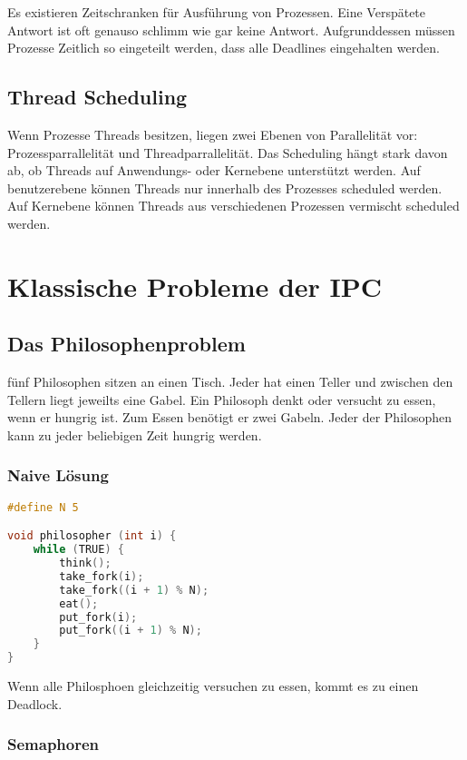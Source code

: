 Es existieren Zeitschranken für Ausführung von Prozessen. Eine Verspätete Antwort ist oft genauso schlimm wie gar keine Antwort. Aufgrunddessen müssen Prozesse Zeitlich so eingeteilt werden, dass alle Deadlines eingehalten werden.

\subsection{Thread Scheduling}

Wenn Prozesse Threads besitzen, liegen zwei Ebenen von Parallelität vor: Prozessparrallelität und Threadparrallelität. Das Scheduling hängt stark davon ab, ob Threads auf Anwendungs- oder Kernebene unterstützt werden. Auf benutzerebene können Threads nur innerhalb des Prozesses scheduled werden. Auf Kernebene können Threads aus verschiedenen Prozessen vermischt scheduled werden.

\section{Klassische Probleme der IPC}

\subsection{Das Philosophenproblem}

fünf Philosophen sitzen an einen Tisch. Jeder hat einen Teller und zwischen den Tellern liegt jeweilts eine Gabel. Ein Philosoph denkt oder versucht zu essen, wenn er hungrig ist. Zum Essen benötigt er zwei Gabeln. Jeder der Philosophen kann zu jeder beliebigen Zeit hungrig werden.

\subsubsection{Naive Lösung}

\begin{lstlisting}[language=C]
#define N 5

void philosopher (int i) {
    while (TRUE) {
        think();
        take_fork(i);
        take_fork((i + 1) % N);
        eat();
        put_fork(i);
        put_fork((i + 1) % N);
    }
} 
\end{lstlisting}

Wenn alle Philosphoen gleichzeitig versuchen zu essen, kommt es zu einen Deadlock.

\subsubsection{Semaphoren}

